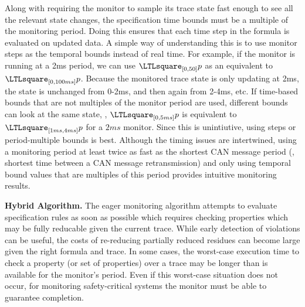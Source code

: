 Along with requiring the monitor to sample its trace state fast enough to see all the relevant state changes, the specification time bounds must be a multiple of the monitoring period.
Doing this ensures that each time step in the formula is evaluated on updated data.
A simple way of understanding this is to use monitor steps as the temporal bounds instead of real time.
For example, if the monitor is running at a 2ms period, we can use $\henceforth_{[0,50]} p$ as an equivalent to $\henceforth_{[0,100ms]} p$.
Because the monitored trace state is only updating at 2ms, the state is unchanged from 0-2ms, and then again from 2-4ms, etc.
If time-based bounds that are not multiples of the monitor period are used, different bounds can look at the same state, \eg, $\henceforth_{[0,5ms]} p$ is equivalent to $\henceforth_{[1ms,4ms]} p$ for a $2ms$ monitor. Since this is unintiutive, using steps or period-multiple bounds is best.
% 
Although the timing issues are intertwined, using a monitoring period at least twice as fast as the shortest CAN message period (\ie, shortest time between a CAN message retransmission) and only using temporal bound values that are multiples of this period provides intuitive monitoring results.


\noindent\textbf{Hybrid Algorithm.}
The eager monitoring algorithm attempts to evaluate specification rules as soon as possible which requires checking properties which may be fully reducable given the current trace.
While early detection of violations can be useful, the costs of re-reducing partially reduced residues can become large given the right formula and trace. In some cases, the worst-case execution time to check a property (or set of properties) over a trace may be longer than is available for the monitor's period. Even if this worst-case situation does not occur, for monitoring safety-critical systems the monitor must be able to guarantee completion.

